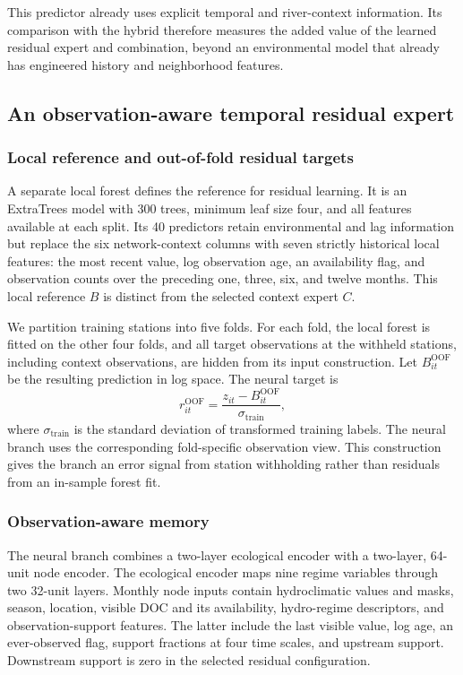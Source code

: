 \documentclass[11pt]{article}
\begin{document}
This predictor already uses explicit temporal and river-context information. Its comparison with the hybrid therefore measures the added value of the learned residual expert and combination, beyond an environmental model that already has engineered history and neighborhood features.

\subsection{An observation-aware temporal residual expert}
\subsubsection{Local reference and out-of-fold residual targets}
A separate local forest defines the reference for residual learning. It is an ExtraTrees model with 300 trees, minimum leaf size four, and all features available at each split. Its 40 predictors retain environmental and lag information but replace the six network-context columns with seven strictly historical local features: the most recent value, log observation age, an availability flag, and observation counts over the preceding one, three, six, and twelve months. This local reference $B$ is distinct from the selected context expert $C$.

We partition training stations into five folds. For each fold, the local forest is fitted on the other four folds, and all target observations at the withheld stations, including context observations, are hidden from its input construction. Let $B_{it}^{\mathrm{OOF}}$ be the resulting prediction in log space. The neural target is
\begin{equation}
 r_{it}^{\mathrm{OOF}}=\frac{z_{it}-B_{it}^{\mathrm{OOF}}}{\sigma_{\mathrm{train}}},
 \label{eq:oof}
\end{equation}
where $\sigma_{\mathrm{train}}$ is the standard deviation of transformed training labels. The neural branch uses the corresponding fold-specific observation view. This construction gives the branch an error signal from station withholding rather than residuals from an in-sample forest fit.

\subsubsection{Observation-aware memory}
The neural branch combines a two-layer ecological encoder with a two-layer, 64-unit node encoder. The ecological encoder maps nine regime variables through two 32-unit layers. Monthly node inputs contain hydroclimatic values and masks, season, location, visible DOC and its availability, hydro-regime descriptors, and observation-support features. The latter include the last visible value, log age, an ever-observed flag, support fractions at four time scales, and upstream support. Downstream support is zero in the selected residual configuration.
\end{document}
